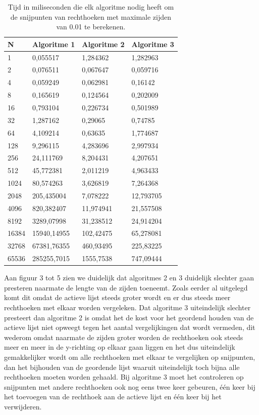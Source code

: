 \documentclass[11pt,a4paper,titlepage]{article}
\begin{document}
		\begin{table}[H]
\centering
\begin{tabular}{ | l | l | l | l |}
\hline
\textbf{N}    &\textbf{Algoritme 1}  & \textbf{Algoritme 2} & \textbf{Algoritme 3} \\ \hline
1     & 0,055517    & 1,284362   & 1,282963  \\ \hline
2     & 0,076511    & 0,067647   & 0,059716 \\ \hline
4     & 0,059249    & 0,062981   & 0,16142   \\ \hline
8     & 0,165619    & 0,124564   & 0,202009    \\ \hline
16    & 0,793104    & 0,226734   & 0,501989    \\ \hline
32    & 1,287162    & 0,29065    & 0,74785     \\ \hline
64    & 4,109214    & 0,63635    & 1,774687     \\ \hline
128   & 9,296115    & 4,283696   & 2,997934     \\ \hline
256   & 24,111769   & 8,204431   & 4,207651    \\ \hline
512   & 45,772381   & 2,011219   & 4,963433   \\ \hline
1024  & 80,574263   & 3,626819   & 7,264368     \\ \hline
2048  & 205,435004  & 7,078222   & 12,793705   \\ \hline
4096  & 820,382407  & 11,974941  & 21,557508    \\ \hline
8192  & 3289,07998  & 31,238512  & 24,914204   \\ \hline
16384 & 15940,14955 & 102,42475  & 65,278081    \\ \hline
32768 & 67381,76355 & 460,93495  & 225,83225    \\ \hline
65536 & 285255,7015 & 1555,7538  & 747,09444 \\ \hline
\end{tabular}
\caption{Tijd in miliseconden die elk algoritme nodig heeft om de snijpunten van rechthoeken met maximale zijden van 0.01 te berekenen.}
\end{table}
Aan figuur 3 tot 5 zien we duidelijk dat algoritmes 2 en 3 duidelijk slechter gaan presteren naarmate de lengte van de zijden toeneemt.  Zoals eerder al uitgelegd komt dit omdat de actieve lijst steeds groter wordt en er dus steeds meer rechthoeken met elkaar worden vergeleken. Dat algoritme 3 uiteindelijk slechter presteert dan algoritme 2 is omdat het de kost voor het geordend houden van de actieve lijst niet opweegt tegen het aantal vergelijkingen dat wordt vermeden, dit wederom omdat naarmate de zijden groter worden de rechthoeken ook steeds meer en meer in de y-richting op elkaar gaan liggen en het dus uiteindelijk gemakkelijker wordt om alle rechthoeken met elkaar te vergelijken op snijpunten, dan het bijhouden van de geordende lijst waaruit uiteindelijk toch bijna alle rechthoeken moeten worden gehaald.  Bij algoritme 3 moet het controleren op snijpunten met andere rechthoeken ook nog eens twee keer gebeuren, één keer bij het toevoegen van de rechthoek aan de actieve lijst en één keer bij het verwijderen.
	
\end{document}
